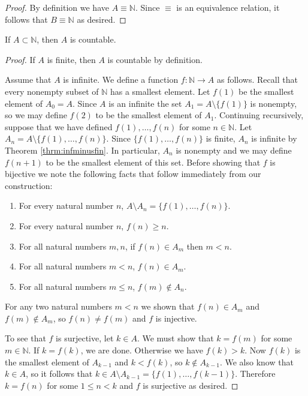 \begin{proof}
By definition we have $A\equiv \mathbb N$.  Since $\equiv$ is an equivalence relation, it follows that $B\equiv\mathbb N$ as desired.
\end{proof}

\begin{thrm}\label{thrm:subcount}
If $A\subset\mathbb N$, then $A$ is countable.
\end{thrm}

\begin{proof}
If $A$ is finite, then $A$ is countable by definition.

Assume that $A$ is infinite. We define a function $f:\mathbb N\to A$ as follows.  Recall that every nonempty subset of $\mathbb N$ has a smallest element.  Let $f(1)$ be the smallest element of $A_0=A$.  Since $A$ is an infinite the set $A_1=A\setminus \{f(1)\}$ is nonempty, so we may define $f(2)$ to be the smallest element of $A_1$.  Continuing recursively, suppose that we have defined $f(1),\ldots,f(n)$ for some $n\in\mathbb N$.  Let $A_n=A\setminus \{ f(1),\ldots,f(n)\}$.  Since $\{ f(1),\ldots,f(n)\}$ is finite, $A_n$ is infinite by Theorem \ref{thrm:infminusfin}. In particular, $A_n$ is nonempty and we may define $f(n+1)$ to be the smallest element of this set. Before showing that $f$ is bijective we note the following facts that follow immediately from our construction:
\begin{enumerate}
\item For every natural number $n$, $A\setminus A_n=\{f(1), \ldots,f(n)\}$.
\item For every natural number $n$, $f(n)\geq n$.
\item For all natural numbers $m,n$, if $f(n)\in A_m$ then $m<n$.
\item For all natural numbers $m<n$, $f(n)\in A_m$.
\item For all natural numbers $m\leq n$, $f(m)\notin A_n$.
\end{enumerate}

For any two natural numbers $m<n$ we shown that $f(n)\in A_m$ and $f(m)\notin A_m$, so $f(n)\neq f(m)$ and $f$ is injective.

To see that $f$ is surjective, let $k\in A$.  We must show that $k=f(m)$ for some $m\in\mathbb N$.  If $k=f(k)$, we are done.  Otherwise we have $f(k)>k$.  Now $f(k)$ is the smallest element of $A_{k-1}$ and $k<f(k)$, so $k\notin A_{k-1}$.  We also know that $k\in A$, so it follows that $k\in A\setminus A_{k-1}=\{f(1),\ldots,f(k-1)\}$. Therefore $k=f(n)$ for some $1\leq n<k$ and $f$ is surjective as desired.
\end{proof}

